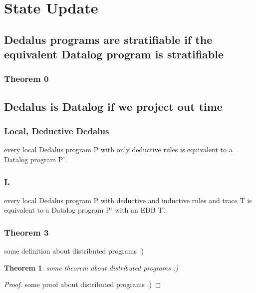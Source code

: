 \section{State Update}

\subsection{Dedalus programs are stratifiable if the equivalent Datalog program is stratifiable}

\subsubsection{Theorem 0}

\subsection{Dedalus is Datalog if we project out time}

\subsubsection{Local, Deductive Dedalus}

every local Dedalus program P with only deductive rules is equivalent to a Datalog program P'.

\subsubsection{L}

every local Dedalus program P with deductive and inductive rules and trace T is equivalent to a Datalog program P' with an EDB T'.

\subsubsection{Theorem 3}

\begin{definition}
some definition about distributed programs :)
\end{definition}

\newtheorem{theorem}{Theorem}
\begin{theorem}
some theorem about distributed programs :)
\end{theorem}

\begin{proof}
some proof about distributed programs :)
\end{proof}

